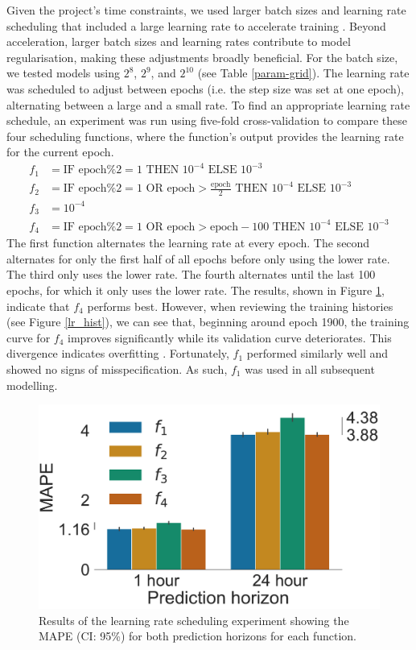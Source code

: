 \documentclass[mstat,12pt]{unswthesis}
\begin{document}
Given the project's time constraints, we used larger batch sizes and learning rate scheduling that included a large learning rate to accelerate training \cite{Smith2018}. Beyond acceleration, larger batch sizes and learning rates contribute to model regularisation, making these adjustments broadly beneficial. For the batch size, we tested models using $2^8$, $2^9$, and $2^{10}$ (see Table \ref{param-grid}). The learning rate was scheduled to adjust between epochs (i.e. the step size was set at one epoch), alternating between a large and a small rate. To find an appropriate learning rate schedule, an experiment was run using five-fold cross-validation to compare these four scheduling functions, where the function's output provides the learning rate for the current epoch. 
\begin{align}
f_1 &=  \text{IF } \text{epoch} \% 2 = 1 \text{ THEN }10^{-4} \text{ ELSE }10^{-3} \\
f_2 &=  \text{IF } \text{epoch} \% 2 = 1 \text{ OR } \text{epoch}>\frac{\text{epoch}}2 
        \text{ THEN }10^{-4} \text{ ELSE }10^{-3} \\
f_3 &=  10^{-4} \\
f_4 &=  \text{IF } \text{epoch} \% 2 = 1 \text{ OR } \text{epoch}>\text{epoch}-100
        \text{ THEN }10^{-4} \text{ ELSE }10^{-3}
\end{align}
The first function alternates the learning rate at every epoch. The second alternates for only the first half of all epochs before only using the lower rate. The third only uses the lower rate. The fourth alternates until the last 100 epochs, for which it only uses the lower rate. The results, shown in Figure \ref{lr_sched}, indicate that $f_4$ performs best. However, when reviewing the training histories (see Figure \ref{lr_hist}), we can see that, beginning around epoch 1900, the training curve for $f_4$ improves significantly while its validation curve deteriorates. This divergence indicates overfitting \cite{Ng2018}. Fortunately, $f_1$ performed similarly well and showed no signs of misspecification. As such, $f_1$ was used in all subsequent modelling.

\begin{figure}[H]
\centerline{\includegraphics[width=.6\columnwidth]{Figures/Plots/LR scheduling experiment results.pdf}}
\caption{Results of the learning rate scheduling experiment showing the MAPE (CI: 95\%) for both prediction horizons for each function.}
\label{lr_sched}
\end{figure}
\end{document}
